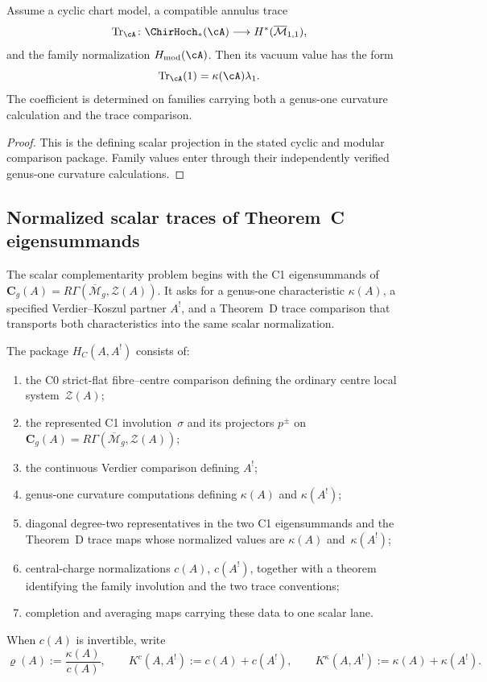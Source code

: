 \begin{proposition}
\label{prop:annulus-trace-standard}
Assume a cyclic chart model, a compatible annulus trace
\[
 \operatorname{Tr}_{\cA}\colon
 \ChirHoch_*(\cA)\longrightarrow
 H^*(\overline{\mathcal M}_{1,1}),
\]
and the family normalization \(H_{\mathrm{mod}}(\cA)\).  Then its
vacuum value has the form
\[
 \operatorname{Tr}_{\cA}(1)=\kappa(\cA)\lambda_1.
\]
The coefficient is determined on families carrying both a genus-one
curvature calculation and the trace comparison.
\end{proposition}

\begin{proof}
This is the defining scalar projection in the stated cyclic and
modular comparison package.  Family values enter through their
independently verified genus-one curvature calculations.
\end{proof}

\subsection{Normalized scalar traces of Theorem~C eigensummands}
\label{subsec:theorem-C-strengthened}

The scalar complementarity problem begins with the C1 eigensummands of
$\mathbf C_g(A)=R\Gamma(\overline{\mathcal M}_g,\mathcal Z(A))$.
It asks for a genus-one characteristic \(\kappa(A)\), a specified
Verdier--Koszul partner \(A^!\), and a Theorem~D trace comparison that
transports both characteristics into the same scalar normalization.

\begin{definition}
\label{def:cct-scalar-complementarity-package}
The package \(H_C(A,A^!)\) consists of:
\begin{enumerate}[label=\textup{(\roman*)}]
\item the C0 strict-flat fibre--centre comparison defining the ordinary
 centre local system~$\mathcal Z(A)$;
\item the represented C1 involution~$\sigma$ and its projectors
 $p^\pm$ on
 $\mathbf C_g(A)=R\Gamma(\overline{\mathcal M}_g,\mathcal Z(A))$;
\item the continuous Verdier comparison defining \(A^!\);
\item genus-one curvature computations defining
 \(\kappa(A)\) and \(\kappa(A^!)\);
\item diagonal degree-two representatives in the two C1 eigensummands
 and the Theorem~D trace maps whose normalized values are
 $\kappa(A)$ and~$\kappa(A^!)$;
\item central-charge normalizations \(c(A)\), \(c(A^!)\), together with
 a theorem identifying the family involution and the two trace
 conventions;
\item completion and averaging maps carrying these data to one scalar
 lane.
\end{enumerate}
When \(c(A)\) is invertible, write
\[
 \varrho(A):=\frac{\kappa(A)}{c(A)},\qquad
 K^c(A,A^!):=c(A)+c(A^!),\qquad
 K^\kappa(A,A^!):=\kappa(A)+\kappa(A^!).
\]
\end{definition}

